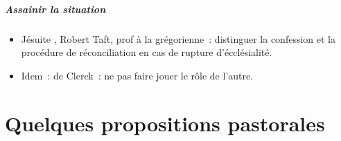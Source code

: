 \hypertarget{assainir-la-situation}{%
\subparagraph{Assainir la situation}\label{assainir-la-situation}}

\begin{itemize}
\item
   
  Jésuite , Robert Taft, prof à la grégorienne~: distinguer la
  confession et la procédure de réconciliation en cas de rupture
  d'écclésialité.
   
\item
   
  Idem~: de Clerck~: ne pas faire jouer le rôle de l'autre.
   
\end{itemize}

\hypertarget{quelques-propositions-pastorales}{%
\section{Quelques propositions
pastorales}\label{quelques-propositions-pastorales}}

